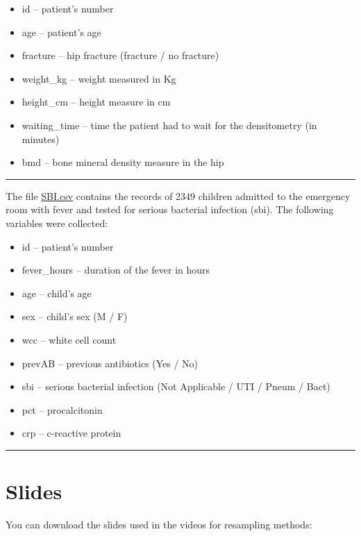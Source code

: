 \documentclass[
]{book}
\providecommand{\tightlist}{%
  \setlength{\itemsep}{0pt}\setlength{\parskip}{0pt}}
\begin{document}
\begin{itemize}
\tightlist
\item
  id -- patient's number
\item
  age -- patient's age
\item
  fracture -- hip fracture (fracture / no fracture)
\item
  weight\_kg -- weight measured in Kg
\item
  height\_cm -- height measure in cm
\item
  waiting\_time -- time the patient had to wait for the densitometry (in minutes)
\item
  bmd -- bone mineral density measure in the hip
\end{itemize}

\begin{center}\rule{0.5\linewidth}{0.5pt}\end{center}

The file \href{https://www.dropbox.com/s/wg32uj43fsy9yvd/SBI.csv?dl=0}{SBI.csv}
contains the records of 2349 children admitted to the
emergency room with fever and tested for serious bacterial infection (sbi).
The following variables were collected:

\begin{itemize}
\tightlist
\item
  id -- patient's number
\item
  fever\_hours -- duration of the fever in hours
\item
  age -- child's age
\item
  sex -- child's sex (M / F)
\item
  wcc -- white cell count
\item
  prevAB -- previous antibiotics (Yes / No)
\item
  sbi -- serious bacterial infection (Not Applicable / UTI / Pneum / Bact)
\item
  pct -- procalcitonin
\item
  crp -- c-reactive protein
\end{itemize}

\begin{center}\rule{0.5\linewidth}{0.5pt}\end{center}

\section*{Slides}\label{slides}

You can download the slides used in the videos for resampling methods:
\end{document}
